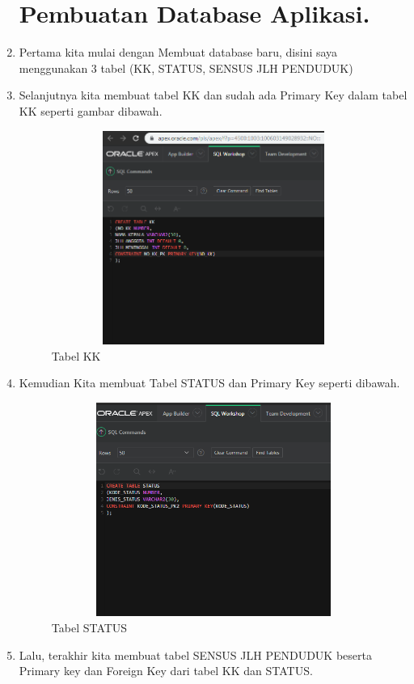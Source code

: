 \begin{enumerate}
\section{Pembuatan Database Aplikasi.}
\item Pertama kita mulai dengan Membuat database baru, disini saya menggunakan 3 tabel (KK, STATUS, SENSUS JLH PENDUDUK)
\item Selanjutnya kita membuat tabel KK dan sudah ada Primary Key dalam tabel KK seperti gambar dibawah.
\begin{figure}[!htbp]
\centering
\includegraphics[width=13cm,height=7cm]{figures/C.PNG}
\caption{Tabel KK}
\label{penanda}
\end{figure}
\item Kemudian Kita membuat Tabel STATUS dan Primary Key seperti dibawah. 
\begin{figure}[!htbp]
\centering
\includegraphics[width=13cm,height=7cm]{figures/D.PNG}
\caption{Tabel STATUS}
\label{penanda}
\end{figure}
\item Lalu, terakhir kita membuat tabel SENSUS JLH PENDUDUK beserta Primary key dan Foreign Key dari tabel KK dan STATUS.
\begin{figure}[!htbp]

\end{figure}
\end{enumerate}
